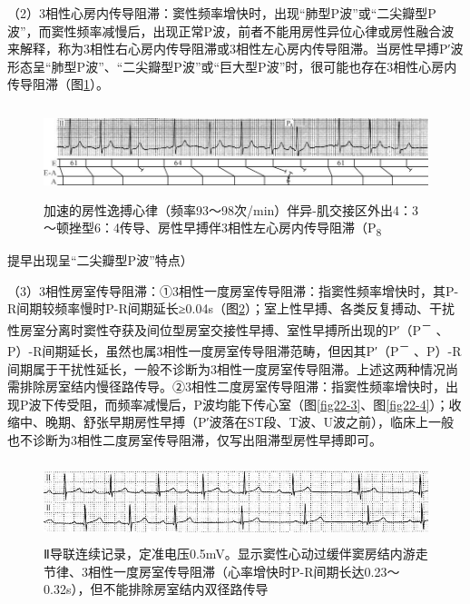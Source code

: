 （2）3相性心房内传导阻滞：窦性频率增快时，出现“肺型P波”或“二尖瓣型P波”，而窦性频率减慢后，出现正常P波，前者不能用房性异位心律或房性融合波来解释，称为3相性右心房内传导阻滞或3相性左心房内传导阻滞。当房性早搏P′波形态呈“肺型P波”、“二尖瓣型P波”或“巨大型P波”时，很可能也存在3相性心房内传导阻滞（图\ref{fig22-1}）。

\begin{figure}[!htbp]
 \centering
 \includegraphics[width=6in,height=1.04167in]{./images/Image00366.jpg}
 \captionsetup{justification=centering}
 \caption{加速的房性逸搏心律（频率93～98次/min）伴异-肌交接区外出4：3～顿挫型6：4传导、房性早搏伴3相性左心房内传导阻滞（P\textsubscript{8}}
 \label{fig22-1}
  \end{figure} 
提早出现呈“二尖瓣型P波”特点）

（3）3相性房室传导阻滞：①3相性一度房室传导阻滞：指窦性频率增快时，其P-R间期较频率慢时P-R间期延长≥0.04s（图\ref{fig22-2}）；室上性早搏、各类反复搏动、干扰性房室分离时窦性夺获及间位型房室交接性早搏、室性早搏所出现的P′（P\textsuperscript{－}
、P）-R间期延长，虽然也属3相性一度房室传导阻滞范畴，但因其P′（P\textsuperscript{－}
、P）-R间期属于干扰性延长，一般不诊断为3相性一度房室传导阻滞。上述这两种情况尚需排除房室结内慢径路传导。②3相性二度房室传导阻滞：指窦性频率增快时，出现P波下传受阻，而频率减慢后，P波均能下传心室（图\ref{fig22-3}、图\ref{fig22-4}）；收缩中、晚期、舒张早期房性早搏（P′波落在ST段、T波、U波之前），临床上一般也不诊断为3相性二度房室传导阻滞，仅写出阻滞型房性早搏即可。

\begin{figure}[!htbp]
 \centering
 \includegraphics[width=5.58333in,height=0.90625in]{./images/Image00367.jpg}
 \captionsetup{justification=centering}
 \caption{Ⅱ导联连续记录，定准电压0.5mV。显示窦性心动过缓伴窦房结内游走节律、3相性一度房室传导阻滞（心率增快时P-R间期长达0.23～0.32s），但不能排除房室结内双径路传导}
 \label{fig22-2}
  \end{figure} 


